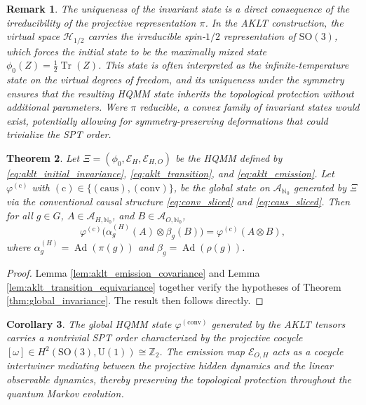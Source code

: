 \documentclass[12pt,a4paper]{article}
\newtheorem{theorem}{Theorem}[section]
\newtheorem{corollary}[theorem]{Corollary}
\newtheorem{remark}[theorem]{Remark}
\begin{document}
\begin{remark}
The uniqueness of the invariant state is a direct consequence of the irreducibility of the projective representation $\pi$. In the AKLT construction, the virtual space $\mathcal{H}_{1/2}$ carries the irreducible spin-$1/2$ representation of $\mathrm{SO}(3)$, which forces the initial state to be the maximally mixed state $\phi_0(Z) = \frac{1}{2}\operatorname{Tr}(Z)$. This state is often interpreted as the infinite-temperature state on the virtual degrees of freedom, and its uniqueness under the symmetry ensures that the resulting HQMM state inherits the topological protection without additional parameters. Were $\pi$ reducible, a convex family of invariant states would exist, potentially allowing for symmetry-preserving deformations that could trivialize the SPT order.
\end{remark}

\begin{theorem}\label{thm:aklt_global_invariance}
Let $\Xi = (\phi_0, \mathcal{E}_H, \mathcal{E}_{H,O})$ be the HQMM defined by \eqref{eq:aklt_initial_invariance}, \eqref{eq:aklt_transition}, and \eqref{eq:aklt_emission}. Let $\varphi^{(\text{c})}$  with $(\text{c})\in\{ (\text{caus}), (\text{conv})\}$, be the global state on $\mathcal{A}_{\mathbb{N}_0}$ generated by $\Xi$ via the conventional causal structure \eqref{eq:conv_sliced} and \eqref{eq:caus_sliced}. Then for all $g \in G$, $A \in \mathcal{A}_{H,\mathbb{N}_0}$, and $B \in \mathcal{A}_{O,\mathbb{N}_0}$,
\begin{equation}
\varphi^{(\text{c})}\bigl( \alpha_g^{(H)}(A) \otimes \beta_g(B) \bigr) = \varphi^{(\text{c})}(A \otimes B),
\label{eq:aklt_global_invariance}
\end{equation}
where $\alpha_g^{(H)} = \operatorname{Ad}(\pi(g))$ and  $\beta_g = \operatorname{Ad}(\rho(g))$.
\end{theorem}

\begin{proof}
Lemma \ref{lem:aklt_emission_covariance} and Lemma \ref{lem:aklt_transition_equivariance} together verify the hypotheses of Theorem \ref{thm:global_invariance}. The result then follows directly.
\end{proof}

\begin{corollary}\label{cor:aklt_spt}
The global HQMM state $\varphi^{(\text{conv})}$ generated by the AKLT tensors carries a nontrivial SPT order characterized by the projective cocycle $[\omega] \in H^2(\mathrm{SO}(3),\mathrm{U}(1)) \cong \mathbb{Z}_2$. The emission map $\mathcal{E}_{O,H}$ acts as a cocycle intertwiner mediating between the projective hidden dynamics and the linear observable dynamics, thereby preserving the topological protection throughout the quantum Markov evolution.
\end{corollary}
\end{document}
